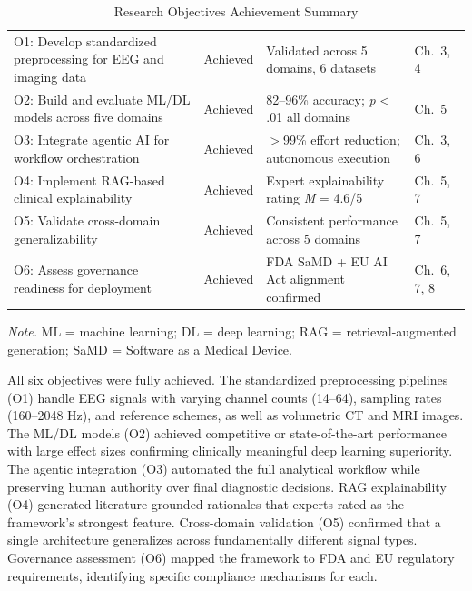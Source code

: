 \begin{table}[H]
\tablestripes
\begin{tabularx}{\textwidth}{L L L L}
\toprule
{} &  &  &  \\
\midrule
O1: Develop standardized preprocessing for EEG and imaging data & Achieved & Validated across 5 domains, 6 datasets & Ch.~3, 4 \\
O2: Build and evaluate ML/DL models across five domains & Achieved & 82--96\% accuracy; \textit{p} < .01 all domains & Ch.~5 \\
O3: Integrate agentic AI for workflow orchestration & Achieved & $>$99\% effort reduction; autonomous execution & Ch.~3, 6 \\
O4: Implement RAG-based clinical explainability & Achieved & Expert explainability rating \textit{M} = 4.6/5 & Ch.~5, 7 \\
O5: Validate cross-domain generalizability & Achieved & Consistent performance across 5 domains & Ch.~5, 7 \\
O6: Assess governance readiness for deployment & Achieved & FDA SaMD + EU AI Act alignment confirmed & Ch.~6, 7, 8 \\
\bottomrule
\end{tabularx}
\caption{Research Objectives Achievement Summary}
\label{tab:objectives_achievement}
\vspace{0.5em}\noindent\textit{Note.} ML = machine learning; DL = deep learning; RAG = retrieval-augmented generation; SaMD = Software as a Medical Device.
\end{table}

All six objectives were fully achieved. The standardized preprocessing pipelines (O1) handle EEG signals with varying channel counts (14--64), sampling rates (160--2048 Hz), and reference schemes, as well as volumetric CT and MRI images. The ML/DL models (O2) achieved competitive or state-of-the-art performance with large effect sizes confirming clinically meaningful deep learning superiority. The agentic integration (O3) automated the full analytical workflow while preserving human authority over final diagnostic decisions. RAG explainability (O4) generated literature-grounded rationales that experts rated as the framework's strongest feature. Cross-domain validation (O5) confirmed that a single architecture generalizes across fundamentally different signal types. Governance assessment (O6) mapped the framework to FDA and EU regulatory requirements, identifying specific compliance mechanisms for each.


